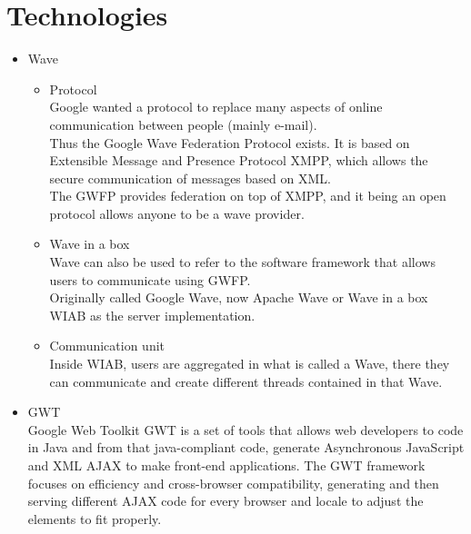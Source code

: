 \newpage
\section{Technologies}

\begin{itemize}
  \item Wave

  \begin{itemize}

    Wave can be interpreted as different things

    \item Protocol\\
    Google wanted a protocol to replace many aspects of online communication between people (mainly e-mail).\\
    Thus the Google Wave Federation Protocol exists. It is based on Extensible Message and Presence Protocol XMPP, which allows the secure communication of messages based on XML.\\
    The GWFP provides federation on top of XMPP, and it being an open protocol allows anyone to be a wave provider.
    
    \item Wave in a box\\
    Wave can also be used to refer to the software framework that allows users to communicate using GWFP.\\
    Originally called Google Wave, now Apache Wave or Wave in a box WIAB as the server implementation.

    \item Communication unit\\
    Inside WIAB, users are aggregated in what is called a Wave, there they can communicate and create different threads contained in that Wave.\\

  \end{itemize}

  \item GWT\\
  Google Web Toolkit GWT is a set of tools that allows web developers to code in Java and from that java-compliant code, generate Asynchronous JavaScript and XML AJAX to make front-end applications. The GWT framework focuses on efficiency and cross-browser compatibility, generating and then serving different AJAX code for every browser and locale to adjust the elements to fit properly.


\end{itemize}

